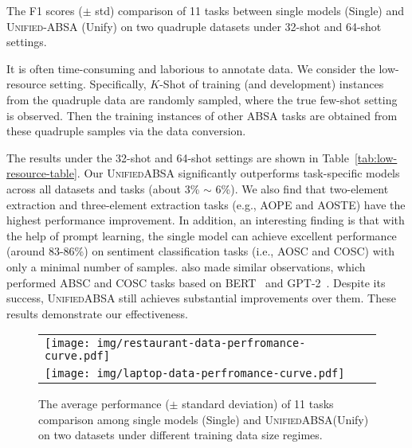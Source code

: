 \documentclass[11pt]{article}
\newcommand{\UnifiedABSA}{\textsc{UnifiedABSA}\xspace}
\begin{document}
\begin{table*}[]
{}
\caption{The F1 scores ($\pm$ std) comparison of 11 tasks between single models (Single) and \textsc{Unified-ABSA} (Unify) on two quadruple datasets under 32-shot and 64-shot settings. }
\label{tab:low-resource-table}
\end{table*} 

It is often time-consuming and laborious to annotate data. We consider the low-resource setting. Specifically, $K$-Shot of training (and development) instances from the quadruple data are randomly sampled, where the true few-shot setting~\citep{DBLP:conf/nips/PerezKC21} is observed. Then the training instances of other ABSA tasks are obtained from these quadruple samples via the data conversion.


The results under the 32-shot and 64-shot settings are shown in Table~\ref{tab:low-resource-table}. Our \UnifiedABSA significantly outperforms task-specific models across all datasets and tasks (about 3\% $\sim$ 6\%). We also find that two-element extraction and three-element extraction tasks (e.g., AOPE and AOSTE) have the highest performance improvement. In addition, an interesting finding is that with the help of prompt learning, the single model can achieve excellent performance (around 83-86\%) on sentiment classification tasks (i.e., AOSC and COSC) with only a minimal number of samples. \citet{seoh-etal-2021-open} also made similar observations, which performed ABSC and COSC tasks based on BERT~\citep{devlin-etal-2019-bert} and GPT-2~\citep{radford2019gpt2}. Despite its success, \UnifiedABSA still achieves substantial improvements over them. These results demonstrate our effectiveness. 


\begin{figure}[t]
\centering
  \setlength{\belowcaptionskip}{-0.5cm}
  \setlength{\abovecaptionskip}{-0.3cm}
\begin{tabular}{p{7cm}p{7cm}}
\centering
\begin{minipage}{0.5\textwidth}

    \hbox{\hspace{0.05em}\texttt{[image: img/restaurant-data-perfromance-curve.pdf]}}
  \end{minipage}\vspace{0.3em}
\\
\begin{minipage}{0.5\textwidth}

    \hbox{\hspace{0.05em}\texttt{[image: img/laptop-data-perfromance-curve.pdf]}}
  \end{minipage}\vspace{0.3em}\\
\end{tabular}
\caption{The average performance ($\pm$ standard deviation) of 11 tasks comparison among single models (Single) and \UnifiedABSA (Unify) on two datasets under different training data size regimes.}
\label{fig:two-data-performance-curve}
\end{figure}
\end{document}
